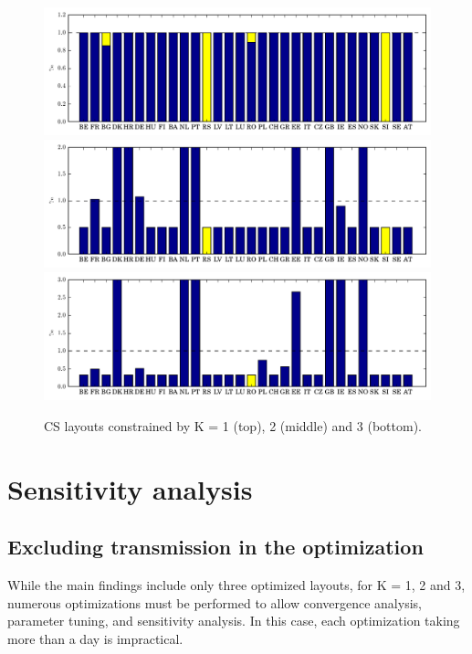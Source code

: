 \documentclass[a4paper, 12pt, sort&compress]{elsarticle}%
\newcommand{\chromowidth}{1.05 \columnwidth}
\begin{document}
\begin{figure}
  \centering
  \includegraphics[width = \chromowidth, center]{VE50cuckooK=1@TRANS10k}
  \includegraphics[width = \chromowidth, center]{VE50cuckooK=2@TRANS10k}
  \includegraphics[width = \chromowidth, center]{VE50cuckooK=3@TRANS10k}
  \caption{CS layouts constrained by K = 1 (top), 2 (middle) and 3
    (bottom). }
  \label{fig:optimized}
\end{figure}

\section{Sensitivity analysis}
\label{sec:sensitivity-analysis}

\subsection{Excluding transmission in the optimization}
\label{sec:incl-transm-optim}

While the main findings include only three optimized layouts, for K =
1, 2 and 3, numerous optimizations must be performed to allow
convergence analysis, parameter tuning, and sensitivity analysis. In
this case, each optimization taking more than a day is impractical. 
\end{document}
